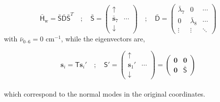 \documentclass[10pt]{article}
\begin{document}
\begin{equation}
	\bar{\mathsf{H}}_\text{w} = \mathsf{\bar{S} \bar{D}\bar{S}}^T 
	\quad ; \quad
	\bar{\mathsf{S}} = 
	\begin{pmatrix}
		\uparrow & \\
		\bar{\boldsymbol{s}}_7 & \cdots \\
		\downarrow &
	\end{pmatrix}
	\quad ; \quad
	\bar{\mathsf{D}} = 
	\begin{pmatrix}
		\bar{\lambda}_7 &  0& \cdots \\
		0 & \bar{\lambda}_8 & \cdots \\
		\vdots & \vdots & \ddots
	\end{pmatrix}
\end{equation}
with $\bar{\nu}_{0\text{--}6} = 0$ cm${}^{-1}$, while the eigenvectors are,

\begin{equation}
	\boldsymbol{s}_i = \mathsf{T}\boldsymbol{s}_i'
	\quad ; \quad
	\mathsf{S}' = \begin{pmatrix}
		\uparrow & \\
		\boldsymbol{s}_1' & \cdots\\
		\downarrow &
	\end{pmatrix}
    = 
	\begin{pmatrix}
		\boldsymbol{0} & \boldsymbol{0} \\
		\boldsymbol{0} & \bar{\mathsf{S}}
	\end{pmatrix}
\end{equation}
\\
which correspond to the normal modes in the original coordinates.
\end{document}
